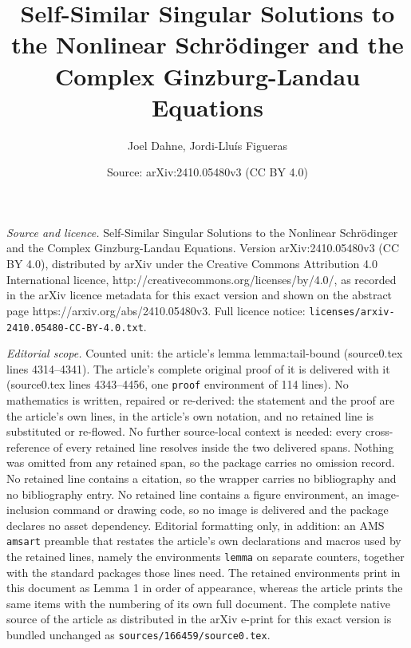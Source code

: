 \documentclass[10pt,a4paper]{amsart}
\title{Self-Similar Singular Solutions to the Nonlinear Schrödinger and the Complex Ginzburg-Landau Equations}
\author{Joel Dahne, Jordi-Llu\'is Figueras}
\date{Source: arXiv:2410.05480v3 (CC BY 4.0)}
\begin{document}
\maketitle

\noindent\emph{Source and licence.} Self-Similar Singular Solutions to the Nonlinear Schrödinger and the Complex Ginzburg-Landau Equations. Version arXiv:2410.05480v3 (CC BY 4.0), distributed by arXiv under the Creative Commons Attribution 4.0 International licence, http://creativecommons.org/licenses/by/4.0/, as recorded in the arXiv licence metadata for this exact version and shown on the abstract page https://arxiv.org/abs/2410.05480v3. Full licence notice: \texttt{licenses/arxiv-2410.05480-CC-BY-4.0.txt}.\par\smallskip

\noindent\textit{Editorial scope.} Counted unit: the article's lemma lemma:tail-bound (source0.tex lines 4314--4341). The article's complete original proof of it is delivered with it (source0.tex lines 4343--4456, one \texttt{proof} environment of 114 lines). No mathematics is written, repaired or re-derived: the statement and the proof are the article's own lines, in the article's own notation, and no retained line is substituted or re-flowed.  No further source-local context is needed: every cross-reference of every retained line resolves inside the two delivered spans.  Nothing was omitted from any retained span, so the package carries no omission record.  No retained line contains a citation, so the wrapper carries no bibliography and no bibliography entry.  No retained line contains a figure environment, an image-inclusion command or drawing code, so no image is delivered and the package declares no asset dependency.  Editorial formatting only, in addition: an AMS \texttt{amsart} preamble that restates the article's own declarations and macros used by the retained lines, namely the environments \texttt{lemma} on separate counters, together with the standard packages those lines need.  The retained environments print in this document as Lemma 1 in order of appearance, whereas the article prints the same items with the numbering of its own full document.  The complete native source of the article as distributed in the arXiv e-print for this exact version is bundled unchanged as \texttt{sources/166459/source0.tex}.
\end{document}
